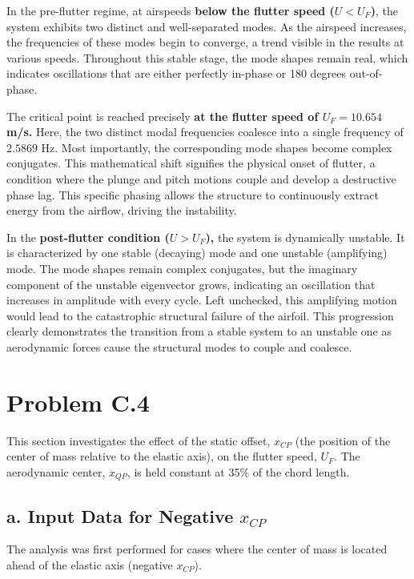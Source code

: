 \documentclass{article}
\begin{document}
In the pre-flutter regime, at airspeeds \textbf{below the flutter speed ($U < U_F$)}, the system exhibits two distinct and well-separated modes. As the airspeed increases, the frequencies of these modes begin to converge, a trend visible in the results at various speeds. Throughout this stable stage, the mode shapes remain real, which indicates oscillations that are either perfectly in-phase or 180 degrees out-of-phase.

The critical point is reached precisely \textbf{at the flutter speed of $U_F = 10.654$ m/s.} Here, the two distinct modal frequencies coalesce into a single frequency of $2.5869$ Hz. Most importantly, the corresponding mode shapes become complex conjugates. This mathematical shift signifies the physical onset of flutter, a condition where the plunge and pitch motions couple and develop a destructive phase lag. This specific phasing allows the structure to continuously extract energy from the airflow, driving the instability.

In the \textbf{post-flutter condition ($U > U_F$),} the system is dynamically unstable. It is characterized by one stable (decaying) mode and one unstable (amplifying) mode. The mode shapes remain complex conjugates, but the imaginary component of the unstable eigenvector grows, indicating an oscillation that increases in amplitude with every cycle. Left unchecked, this amplifying motion would lead to the catastrophic structural failure of the airfoil. This progression clearly demonstrates the transition from a stable system to an unstable one as aerodynamic forces cause the structural modes to couple and coalesce.



\newpage
\section{Problem C.4}
This section investigates the effect of the static offset, $x_{CP}$ (the position of the center of mass relative to the elastic axis), on the flutter speed, $U_F$. The aerodynamic center, $x_{QP}$, is held constant at 35\% of the chord length.

\subsection{a. Input Data for Negative $x_{CP}$}
The analysis was first performed for cases where the center of mass is located ahead of the elastic axis (negative $x_{CP}$).
\end{document}

